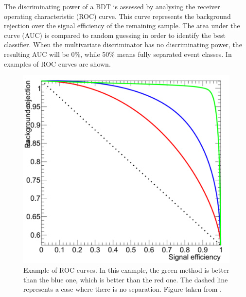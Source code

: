 %


The discriminating power of a BDT is assessed by analysing the receiver operating characteristic (ROC) curve. This curve represents the background rejection over the signal efficiency of the remaining sample. The area under the curve (AUC) is compared to  random guessing in order to identify the best classifier. 
When the multivariate discriminator has no discriminating power, the resulting AUC will be 0\%, while 50\%  means fully separated event classes. In  examples of ROC curves are shown. 
\begin{figure}[htbp]
	\centering
	\includegraphics[width=0.7\linewidth]{3_Analysis_techniques/Figures/ROC}
	\caption{Example of ROC curves. In this example, the green method is better than the blue one, which is better than the red one. The dashed line represents a case where there is no separation. Figure taken from \cite{ROC}.}
	\label{fig:ROC}
\end{figure}




